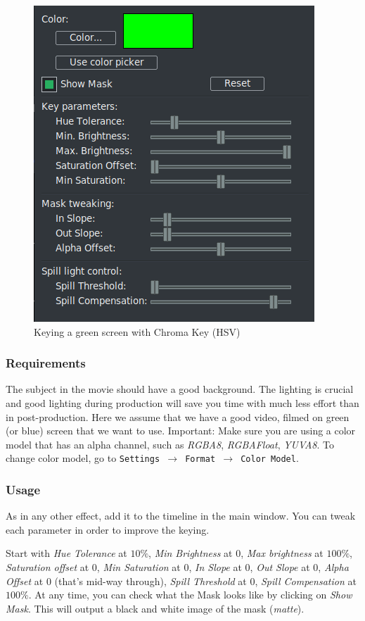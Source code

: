 \begin{figure}[htpb]
    \centering
    \includegraphics[width=0.55\linewidth]{images/chroma-key-hsv.png}
    \caption{Keying a green screen with Chroma Key (HSV)}
    \label{fig:chroma-key-hsv}
\end{figure}

\subsubsection*{Requirements}
\label{ssub:requirements}

The subject in the movie should have a good background. The lighting is crucial and good lighting during production will save you time with much less effort than in post-production.
Here we assume that we have a good video, filmed on green (or blue) screen that we want to use. Important: Make sure you are using a color model that has an alpha channel, such as \textit{RGBA8}, \textit{RGBAFloat}, \textit{YUVA8}. To change color model, go to \texttt{Settings $\rightarrow$ Format $\rightarrow$ Color Model}.

\subsubsection*{Usage}
\label{ssub:usage}

As in any other effect, add it to the timeline in the main window. You can tweak each parameter in order to improve the keying.

Start with \textit{Hue Tolerance} at $10\%$, \textit{Min Bright\-ness} at $0$, \textit{Max bright\-ness} at $100\%$, \textit{Saturation offset} at $0$, \textit{Min Saturation} at $0$, \textit{In Slope} at $0$, \textit{Out Slope} at $0$, \textit{Alpha Offset} at $0$ (that’s mid-way through), \textit{Spill Threshold} at $0$, \textit{Spill Compensation} at $100\%$. At any time, you can check what the Mask looks like by clicking on \textit{Show Mask}. This will output a black and white image of the mask (\textit{matte}).

